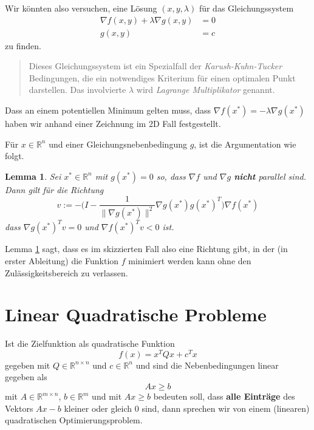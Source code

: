 \documentclass[]{book}
\newenvironment {JHSAYS} [0] {\begin{quote}\color{jhsc}} {\end{quote}}
\newtheorem{lemma}{Lemma}[chapter]
\theoremstyle{definition}
\theoremstyle{definition}
\theoremstyle{definition}
\theoremstyle{definition}
\theoremstyle{remark}
\begin{document}
Wir könnten also versuchen, eine Lösung \((x,y,\lambda)\) für das Gleichungssystem
\begin{equation}
\begin{split}
\nabla f(x, y) + \lambda \nabla g(x, y) &=0 \\
g(x,y) &= c
\end{split}
\label{eq:kkt-sc}
\end{equation}
zu finden.

\leavevmode\hypertarget{lagrange-KKT}{}%
\begin{JHSAYS}
Dieses Gleichungssystem ist ein Spezialfall der \emph{Karush-Kuhn-Tucker} Bedingungen, die ein notwendiges Kriterium für einen optimalen Punkt darstellen. Das involvierte \(\lambda\) wird \emph{Lagrange Multiplikator} genannt.

\end{JHSAYS}

Dass an einem potentiellen Minimum gelten muss, dass \(\nabla f(x^*) = -\lambda \nabla g(x^*)\) haben wir anhand einer Zeichnung im 2D Fall festgestellt.

Für \(x\in \mathbb R^{n}\) und einer Gleichungsnebenbedingung \(g\), ist die Argumentation wie folgt.

\begin{lemma}
\protect\hypertarget{lem:not-para-not-min}{}\label{lem:not-para-not-min}Sei \(x^*\in \mathbb R^{n}\) mit \(g(x^*)=0\) so, dass \(\nabla f\) und \(\nabla g\) \textbf{nicht} parallel sind. Dann gilt für die Richtung
\begin{equation*}
v := -\biggl (I-\frac{1}{\|\nabla g(x^*)\|^2}\nabla g(x^*)g(x^*)^T \biggr )\nabla f(x^*)
\end{equation*}
dass \(\nabla g(x^*)^Tv=0\) und \(\nabla f(x^*)^Tv<0\) ist.
\end{lemma}

Lemma \ref{lem:not-para-not-min} sagt, dass es im skizzierten Fall also eine Richtung gibt, in der (in erster Ableitung) die Funktion \(f\) minimiert werden kann ohne den Zulässigkeitsbereich zu verlassen.

\hypertarget{linear-quadratische-probleme}{%
\section{Linear Quadratische Probleme}\label{linear-quadratische-probleme}}

Ist die Zielfunktion als quadratische Funktion
\begin{equation*}
f(x) = x^T Q x + c^Tx 
\end{equation*}
gegeben mit \(Q\in \mathbb R^{n\times n}\) und \(c\in \mathbb R^{n}\) und sind die Nebenbedingungen linear gegeben als
\begin{equation*}
Ax \geq b
\end{equation*}
mit \(A\in \mathbb R^{m\times n}\), \(b\in \mathbb R^{m}\) und mit \(Ax \geq b\) bedeuten soll, dass \textbf{alle Einträge} des Vektors \(Ax-b\) kleiner oder gleich \(0\) sind, dann sprechen wir von einem (linearen) quadratischen Optimierungsproblem.
\end{document}
